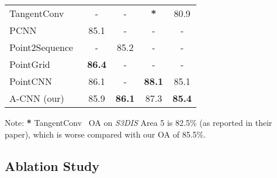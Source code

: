 \documentclass[10pt,twocolumn,letterpaper]{article}
\begin{document}
\begin{table}[h]
{\begin{tabular}{@{}l|c|c|c|c}
TangentConv~\cite{tatarchenko2018tangent} & - & - & \textbf{*} & 80.9 \\
PCNN~\cite{atzmon2018point}       & 85.1 &  - & - & - \\
Point2Sequence~\cite{liu2018point2sequence} & - & 85.2 & - & - \\
PointGrid~\cite{le2018pointgrid} & \textbf{86.4} & - & - & - \\
PointCNN~\cite{li2018pointcnn}     & 86.1 & - & \textbf{88.1} & 85.1 \\ \hline
A-CNN (our)  & 85.9 & \textbf{86.1} & 87.3 & \textbf{85.4}  \\ \hline
\end{tabular}
} \label{table:s3dis_eval}
 \begin{tablenotes}
      \centering
      \footnotesize \item Note: \textbf{*} TangentConv~\cite{tatarchenko2018tangent} OA on \emph{S3DIS} Area 5 is 82.5$\%$ (as reported in their paper), which is worse compared with our OA of 85.5$\%$.\vspace{-3mm}
    \end{tablenotes}
\end{table}







\vspace{-1mm}
\subsection{Ablation Study} \vspace{-1mm}
\label{sec:ablation}
\end{document}
